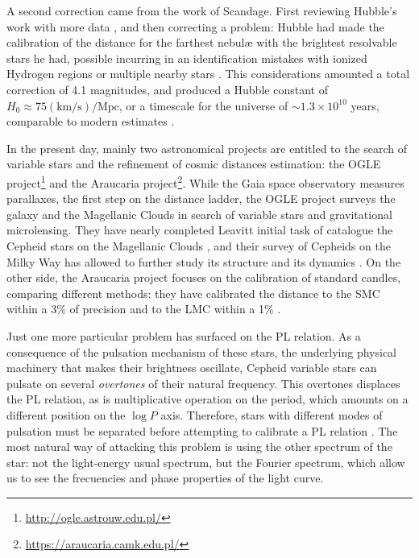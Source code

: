
A second correction came from the work of Scandage. First reviewing Hubble's work with more data \citep{Sandage1956}, and then correcting a problem:
Hubble had made the calibration of the distance for the farthest nebul\ae{} with the brightest resolvable stars he had,
possible incurring in an identification mistakes with ionized Hydrogen regions or multiple nearby stars \citep{Sandage1958}.
This considerations amounted a total correction of 4.1 magnitudes, 
and produced a Hubble constant of $H_0 \approx 75 (\text{km}/\text{s})/\text{Mpc}$, 
or a timescale for the universe of $\sim1.3\times 10^{10}$ years, comparable to modern estimates \citep{Freedman2001}.


In the present day, mainly two astronomical projects are entitled to the search of variable stars and the refinement of cosmic distances estimation:
the OGLE project\footnote{\url{http://ogle.astrouw.edu.pl/}} and the Araucaria project\footnote{\url{https://araucaria.camk.edu.pl/}}.
While the Gaia space observatory measures parallaxes, the first step on the distance ladder, 
the OGLE project surveys the galaxy and the Magellanic Clouds in search of variable stars and gravitational microlensing.
They have nearly completed Leavitt initial task of catalogue the Cepheid stars on the Magellanic Clouds \citep{OGLE2017},
and their survey of Cepheids on the Milky Way has allowed to further study its structure \citep{Skowron2019} and its dynamics \citep{Mroz2019}.
On the other side, the Araucaria project focuses on the calibration of standard candles, comparing different methods: 
they have calibrated the distance to the SMC within a 3\% of precision \citep{Araucaria2014} and to the LMC within a 1\% \citep{Araucaria2019}.



Just one more particular problem has surfaced on the PL relation. 
As a consequence of the pulsation mechanism of these stars, 
the underlying physical machinery that makes their brightness oscillate,
Cepheid variable stars can pulsate on several \textit{overtones} of their natural frequency.
This overtones displaces the PL relation, as is multiplicative operation on the period, 
which amounts on a different position on the $\log P$ axis.
Therefore, stars with different modes of pulsation must be separated before attempting to calibrate a PL relation \citep{Zabolotski2005}.
The most natural way of attacking this problem is using the other spectrum of the star: 
not the light-energy usual spectrum, but the Fourier spectrum, 
which allow us to see the frecuencies and phase properties of the light curve.

